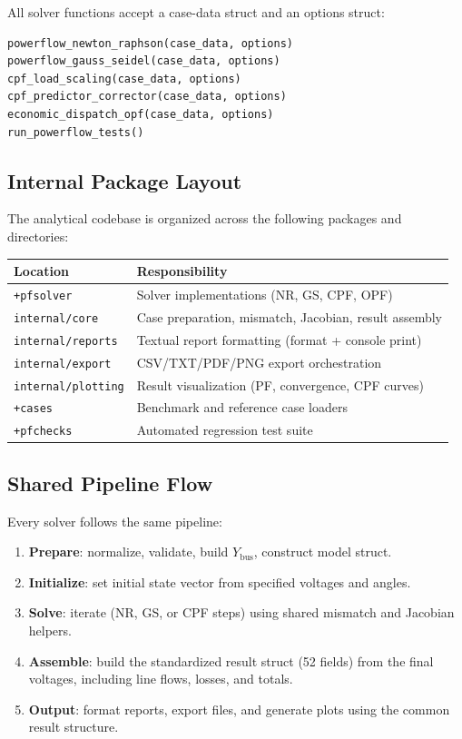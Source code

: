 \documentclass[12pt,a4paper]{article}
\begin{document}
All solver functions accept a case-data struct and an options struct:
\begin{lstlisting}
powerflow_newton_raphson(case_data, options)
powerflow_gauss_seidel(case_data, options)
cpf_load_scaling(case_data, options)
cpf_predictor_corrector(case_data, options)
economic_dispatch_opf(case_data, options)
run_powerflow_tests()
\end{lstlisting}
\newpage
\subsection{Internal Package Layout}

The analytical codebase is organized across the following packages and directories:

\begin{center}
\begin{tabular}{ll}
\toprule
Location & Responsibility \\
\midrule
\texttt{+pfsolver} & Solver implementations (NR, GS, CPF, OPF) \\
\texttt{internal/core} & Case preparation, mismatch, Jacobian, result assembly \\
\texttt{internal/reports} & Textual report formatting (format + console print) \\
\texttt{internal/export} & CSV/TXT/PDF/PNG export orchestration \\
\texttt{internal/plotting} & Result visualization (PF, convergence, CPF curves) \\
\texttt{+cases} & Benchmark and reference case loaders \\
\texttt{+pfchecks} & Automated regression test suite \\
\bottomrule
\end{tabular}
\end{center}

\subsection{Shared Pipeline Flow}

Every solver follows the same pipeline:
\begin{enumerate}[leftmargin=1.5em]
    \item \textbf{Prepare}: normalize, validate, build $Y_{\text{bus}}$, construct model struct.
    \item \textbf{Initialize}: set initial state vector from specified voltages and angles.
    \item \textbf{Solve}: iterate (NR, GS, or CPF steps) using shared mismatch and Jacobian helpers.
    \item \textbf{Assemble}: build the standardized result struct (52 fields) from the final voltages, including line flows, losses, and totals.
    \item \textbf{Output}: format reports, export files, and generate plots using the common result structure.
\end{enumerate}
\end{document}
